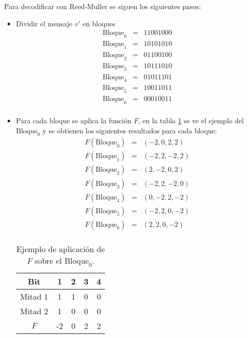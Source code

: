 Para decodificar con Reed-Muller se siguen los siguientes pasos:
\begin{itemize}
	\item Dividir el mensaje \(v'\) en bloques
	\begin{equation}
		\begin{array}{ccc}
			\text{Bloque}_0 &=& 1100 1000\\
			\text{Bloque}_1	&=& 1010 1010\\
			\text{Bloque}_2	&=& 0110 0100\\
			\text{Bloque}_3	&=& 1011 1010\\
			\text{Bloque}_4	&=& 0101 1101\\
			\text{Bloque}_5	&=& 1001 1011\\
			\text{Bloque}_6	&=& 0001 0011\\			
		\end{array}
	\end{equation}
	\item Para cada bloque se aplica la función \(F\), en la tabla \ref{tab:majority} se ve el ejemplo del $\text{Bloque}_0$ y se obtienen los siguientes resultados para cada bloque:
	\begin{equation}
		\begin{array}{ccc}
			F(\text{Bloque}_0) &=& (-2,0,2,2)\\
			F(\text{Bloque}_1)	&=& (-2,2,-2,2)\\
			F(\text{Bloque}_2)	&=& (2,-2,0,2)\\
			F(\text{Bloque}_3)	&=& (-2,2,-2,0)\\
			F(\text{Bloque}_4)	&=& (0,-2,2,-2)\\
			F(\text{Bloque}_5)	&=& (-2,2,0,-2)\\
			F(\text{Bloque}_6)	&=& (2,2,0,-2)\\			
		\end{array}
	\end{equation}
	\begin{table}[H]
		\centering
		\begin{tabular}{|c|c|c|c|c|}
			\hline
			Bit & 1 & 2 & 3 & 4 \\
			\hline
			Mitad 1 & 1 & 1 & 0 & 0 \\
			Mitad 2 & 1 & 0 & 0 & 0 \\
			\hline
			\(F\) & -2 & 0 & 2 & 2 \\
			\hline
		\end{tabular}
		\caption{Ejemplo de aplicación de \(F\) sobre el $\text{Bloque}_0$.}
		\label{tab:majority}
	\end{table}

\end{itemize}
